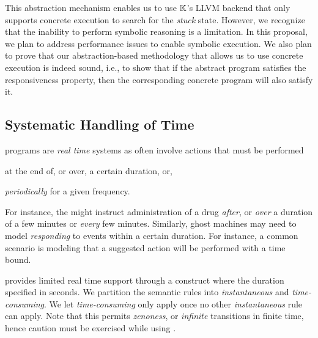 This abstraction mechanism enables us to use $\mathbb{K}$'s LLVM backend
that only supports concrete execution to search for the \emph{stuck}
state. However, we recognize that the inability to perform symbolic
reasoning is a limitation. In this proposal, we plan to
address performance issues to enable symbolic execution.
We also plan to prove that our abstraction-based methodology
that allows us to use concrete execution is indeed sound, i.e.,
to show that if the abstract program satisfies the responsiveness
property, then the corresponding concrete program will also satisfy it.

\subsection{Systematic Handling of Time}\label{subsec:modeling-time}

\MediK{} programs are \emph{real time} systems as \BPGs{}
often involve actions that must be performed
\begin{enumerate*}[label=(\alph*)]
  \item at the end of, or over, a certain duration, or,
  \item \emph{periodically} for a given frequency.
\end{enumerate*}
For instance, the \BPG{} might instruct administration of a
drug \emph{after}, or \emph{over} a duration of a few minutes
or \emph{every} few minutes. Similarly, ghost machines may
need to model \emph{responding} to events within a certain duration.
For instance, a common scenario is modeling that a suggested action will be
performed with a time bound.

\MediK{} provides limited real time support through a 
construct where the duration specified in seconds. We partition the
semantic rules into \emph{instantaneous} and \emph{time-consuming}.
We let \emph{time-consuming} only apply once no other \emph{instantaneous} rule can apply.
Note that this permits \emph{zenoness}, or \emph{infinite} transitions in
finite time, hence caution must be exercised while using .

